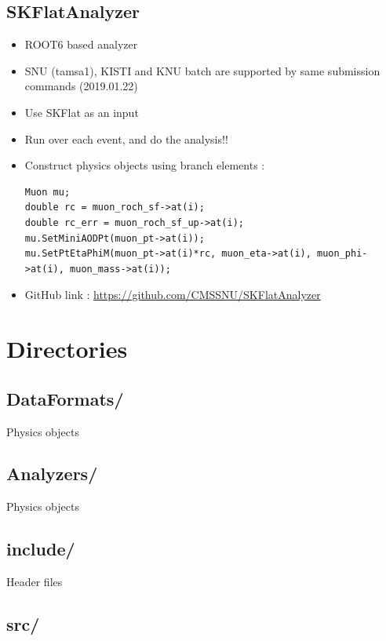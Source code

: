 \documentclass[12pt, a4paper, titlepage]{article}
\begin{document}
\subsection{SKFlatAnalyzer}
\begin{itemize}
\item ROOT6 based analyzer
\item SNU (tamsa1), KISTI and KNU batch are supported by same submission commands (2019.01.22)
\item Use SKFlat as an input
\item Run over each event, and do the analysis!!
\item Construct physics objects using branch elements :
  \begin{lstlisting}
Muon mu;
double rc = muon_roch_sf->at(i);
double rc_err = muon_roch_sf_up->at(i);
mu.SetMiniAODPt(muon_pt->at(i));
mu.SetPtEtaPhiM(muon_pt->at(i)*rc, muon_eta->at(i), muon_phi->at(i), muon_mass->at(i));
  \end{lstlisting}
\item GitHub link : \href{https://github.com/CMSSNU/SKFlatAnalyzer}{https://github.com/CMSSNU/SKFlatAnalyzer}
\end{itemize}

\clearpage

\section{Directories}

\subsection{DataFormats/}

Physics objects

\subsection{Analyzers/}

Physics objects

\subsection{include/}

Header files

\subsection{src/}
\end{document}
